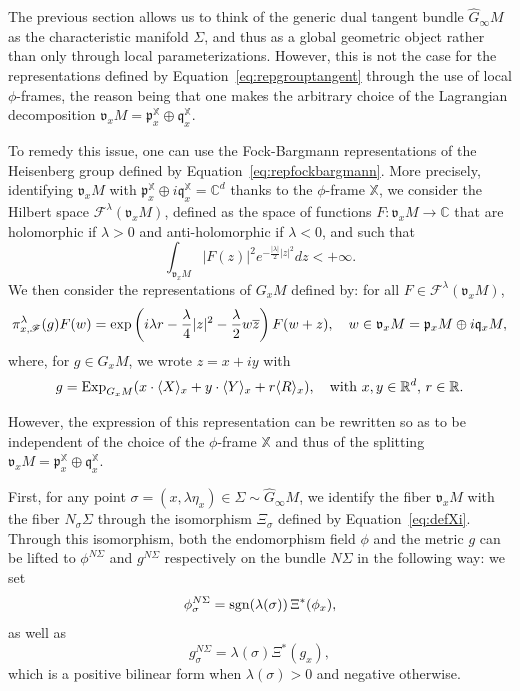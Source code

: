 \documentclass[12pt,a4paper]{amsart}
\theoremstyle{plain}
\theoremstyle{definition}
\theoremstyle{remark}
\numberwithin{equation}{section}
\theoremstyle{definition}
\def\R{{\mathbb R}}%
\def\C{{\mathbb C}}%
\def \Exp{{\rm Exp}}
\def \exp{{\rm exp}}
\def \bX{\mathbb{X}}
\def \Ghat{\widehat{G}}
\def \fv{\mathfrak{v}}
\numberwithin{equation}{section}
\begin{document}
The previous section allows us to think of the generic dual tangent bundle $\Ghat_\infty M$ as the characteristic manifold $\Sigma$, and thus as a global geometric object rather than only through local parameterizations. However, this is not the case for the representations defined by Equation~\eqref{eq:repgrouptangent} through the use of local $\phi$-frames, the reason being that one makes the arbitrary choice of the Lagrangian decomposition $\fv_x M = \mathfrak{p}_x^\bX \oplus\mathfrak{q}_x^\bX$.

To remedy this issue, one can use the Fock-Bargmann representations of the Heisenberg group defined by Equation~\eqref{eq:repfockbargmann}. More precisely, identifying $\fv_x M$ with $\mathfrak{p}_x^\bX \oplus i\mathfrak{q}_x^\bX = \C^d$ thanks to the $\phi$-frame $\bX$, we consider the Hilbert space $\mathscr{F}^\lambda(\mathfrak{v}_x M)$, defined as the space of functions $F:\mathfrak{v}_x M\rightarrow\C$ that are holomorphic if $\lambda >0$ and anti-holomorphic if $\lambda <0$, and such that 
\begin{equation*}
     \int_{\mathfrak{v}_x M} |F(z)|^2 e^{-\frac{|\lambda|}{2}|z|^2}dz < +\infty.
\end{equation*}
We then consider the representations of $G_xM$ defined by: for all $F\in\mathscr{F}^\lambda(\mathfrak{v}_x M)$,
\begin{equation*}
    \pi^\lambda_{x,\mathscr{F}}(g) F(w) = \exp\left(i \lambda r - \frac{\lambda}{4}|z|^2-\frac{\lambda}{2}w \overline{z}\right) F(w+z),\quad w\in\mathfrak{v}_x M = \mathfrak{p}_x M\oplus i \mathfrak{q}_x M,
\end{equation*}
where, for $g\in G_x M$, we wrote $z = x+iy$ with
\begin{equation*}
 g = \Exp_{G_x M}(x\cdot\langle X\rangle_x + y\cdot \langle Y\rangle_x + r\langle R \rangle_x),\quad\mbox{with}\ x,y\in\R^d,\,r\in\R.
\end{equation*}

However, the expression of this representation can be rewritten so as to be independent of the choice of the $\phi$-frame $\bX$ and thus of the splitting $\fv_x M = \mathfrak{p}_x^\bX \oplus\mathfrak{q}_x^\bX$.

First, for any point $\sigma = (x,\lambda\eta_x)\in\Sigma \sim \Ghat_\infty M$, we identify the fiber $\mathfrak{v}_x M$ with the fiber $N_\sigma \Sigma$ through the isomorphism $\Xi_\sigma$ defined by Equation~\eqref{eq:defXi}. Through this isomorphism, both the endomorphism field $\phi$ and the metric $g$ can be lifted to $\phi^{N\Sigma}$ and $g^{N\Sigma}$ respectively on the bundle $N \Sigma$ in the following way: we set
\begin{equation*}
    \phi_\sigma^{N\Sigma} = {\rm sgn}(\lambda(\sigma))\,\Xi^*(\phi_x),
\end{equation*}
as well as
\begin{equation}
    g_\sigma^{N\Sigma} = \lambda(\sigma) \Xi^*(g_x),
\end{equation}
which is a positive bilinear form when $\lambda(\sigma) >0$ and negative otherwise.
\end{document}

